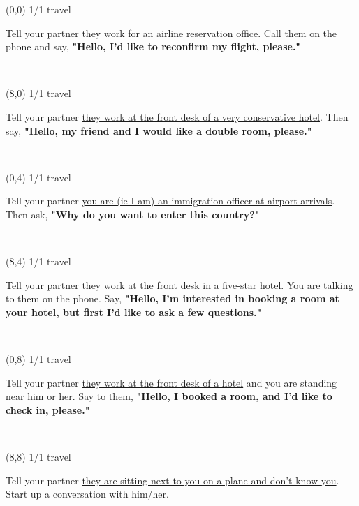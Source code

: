 \documentclass[a4paper]{article}
\newcommand{\mycard}[5]{%
	\vspace{0.1cm}
	\small #1 #2
	\par
	\parbox[t][6.7cm][c]{9.5cm}{%
	\hspace{0.1cm} \Large#3\\
	\normalsize#4 #5
	}
}
\begin{document}
\selectfont

\begin{textblock}{8}(0,0)
\mycard{1/1}{travel}{\parbox{9.0cm}{
Tell your partner \ul{they work for an airline reservation office}. Call them on the phone and say, \textbf{"Hello, I'd like to reconfirm my flight, please."}
}}{}{} 
\end{textblock}

\begin{textblock}{8}(8,0)
\mycard{1/1}{travel}{\parbox{9.0cm}{
Tell your partner \ul{they work at the front desk of a very conservative hotel}. Then say, \textbf{"Hello, my friend and I would like a double room, please."}
}}{}{} 
\end{textblock}

\begin{textblock}{8}(0,4)
\mycard{1/1}{travel}{\parbox{9.0cm}{
Tell your partner \ul{you are (ie I am) an immigration officer at airport arrivals}. Then ask, {\bfseries "Why do you want to enter this country?"}
}}{}{} 
\end{textblock}

\begin{textblock}{8}(8,4)
\mycard{1/1}{travel}{\parbox{9.0cm}{
Tell your partner \ul{they work at the front desk in a five-star hotel}. You are talking to them on the phone. Say, \textbf{"Hello, I'm interested in booking a room at your hotel, but first I'd like to ask a few questions."}
}}{}{} 
\end{textblock}

\begin{textblock}{8}(0,8)
\mycard{1/1}{travel}{\parbox{9.0cm}{
Tell your partner \ul{they work at the front desk of a hotel} and you are standing near him or her. Say to them, \textbf{"Hello, I booked a room, and I'd like to check in, please."}
}}{}{} 
\end{textblock}

\begin{textblock}{8}(8,8)
\mycard{1/1}{travel}{\parbox{9.0cm}{
Tell your partner \ul{they are sitting next to you on a plane and don't know you}. Start up a conversation with him/her.
}}{}{} 
\end{textblock}
\end{document}
